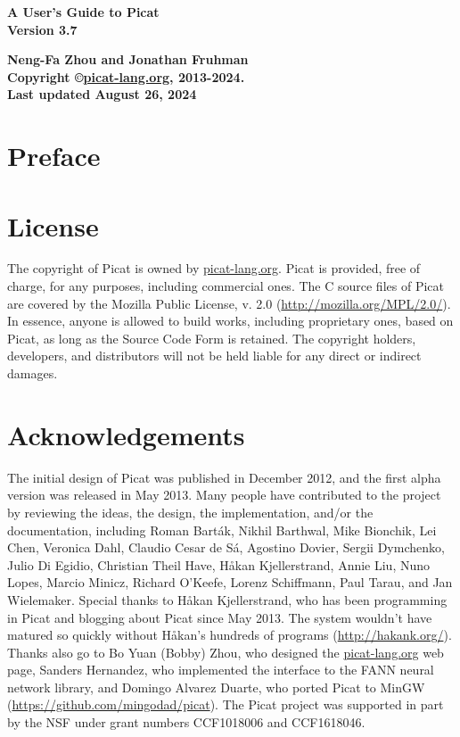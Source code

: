 \documentclass[11pt]{report}
\begin{document}
\vspace*{4cm}
\begin{center}
{\Huge\bf A User's Guide to Picat} \\
{\large\bf Version 3.7} \\


\vspace*{1cm}

{\large\bf Neng-Fa Zhou and Jonathan Fruhman} \\
\vspace*{1cm}
{\bf Copyright \copyright \url{picat-lang.org}, 2013-2024.} \\
{\bf Last updated August 26, 2024} \\
\end{center}
\thispagestyle{empty}
\clearpage

\pagestyle{plain}

\section*{Preface}


\clearpage
\section*{License}
The copyright of Picat is owned by \url{picat-lang.org}. Picat is provided, free of charge, for any purposes, including commercial ones. The C source files of Picat are covered by the Mozilla Public License, v. 2.0 (\url{http://mozilla.org/MPL/2.0/}). In essence, anyone is allowed to build works, including proprietary ones, based on Picat, as long as the Source Code Form is retained. The copyright holders, developers, and distributors will not be held liable for any direct or indirect damages.

 
\section*{Acknowledgements}
The initial design of Picat was published in December 2012, and the first alpha version was released in May 2013.  Many people have contributed to the project by reviewing the ideas, the design, the implementation, and/or the documentation, including Roman Bart\'{a}k, Nikhil Barthwal, Mike Bionchik, Lei Chen, Veronica Dahl, Claudio Cesar de S\'{a}, Agostino Dovier, Sergii Dymchenko, Julio Di Egidio, Christian Theil Have, H{\aa}kan Kjellerstrand,  Annie Liu, Nuno Lopes, Marcio Minicz, Richard O'Keefe, Lorenz Schiffmann, Paul Tarau, and Jan Wielemaker.  Special thanks to H{\aa}kan Kjellerstrand, who has been programming in Picat and blogging about Picat since May 2013. The system wouldn't have matured so quickly without H{\aa}kan's hundreds of programs (\url{http://hakank.org/}). Thanks also go to Bo Yuan (Bobby) Zhou, who designed the \url{picat-lang.org} web page, Sanders Hernandez, who implemented the interface to the FANN neural network library, and Domingo Alvarez Duarte, who ported Picat to MinGW (\url{https://github.com/mingodad/picat}). The Picat project was supported in part by the NSF under grant numbers CCF1018006 and CCF1618046.
\end{document}
